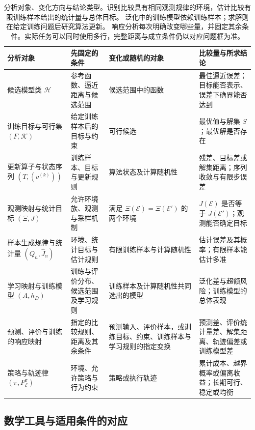\begin{table}[htbp]
  \centering
  \begin{tabularx}{\linewidth}{>{\RaggedRight\arraybackslash}p{.18\linewidth}XXX}
    \toprule
    分析对象 & 先固定的条件 & 变化或随机的对象 & 比较量与所求结论\\
    \midrule
    候选模型类 $\mathcal H$ & 参考函数、逼近距离与候选范围 & 候选范围中的函数 & 最佳逼近误差；目标能否表示、误差下确界能否达到\\
    训练目标与可行集 $(F,\mathcal K)$ & 给定训练样本后的目标与约束 & 可行候选 & 最优值与解集 $S$；最优解是否存在\\
    更新算子与状态序列 $(T,(v^{(k)}))$ & 训练样本、目标与更新规则 & 算法状态及计算随机性 & 残差、目标差或解集距离；序列收敛与有限步误差\\
    观测映射与统计目标 $(\Xi,J)$ & 允许环境族、观测与采样机制 & 满足 $\Xi(\mathcal E)=\Xi(\mathcal E')$ 的两个环境 & $J(\mathcal E)$ 是否等于 $J(\mathcal E')$；观测能否确定目标\\
    样本生成规律与统计量 $(Q_n,\widehat J_n)$ & 环境、统计目标与估计规则 & 有限训练样本与计算随机性 & 估计误差及其概率；有限样本能估计多准\\
    学习映射与训练模型 $(A,h_D)$ & 训练与评价分布、候选范围及学习规则 & 训练样本及计算随机性共同选出的模型 & 泛化差与超额风险；训练模型的总体表现\\
    预测、评价与训练的响应映射 & 指定的比较规则、距离及其余条件 & 预测输入、评价样本，或训练目标、约束、训练样本与学习规则的指定变换 & 预测差、评价统计量差、解集距离、轨迹偏差或训练模型差\\
    策略与轨迹律 $(\pi,P_{\mathcal E}^{\pi})$ & 环境、允许策略与行为约束 & 策略或执行轨迹 & 累计成本、越界概率或偏离收益；长期可行、稳定或均衡\\
    \bottomrule
  \end{tabularx}
  \caption{分析对象、变化方向与结论类型。识别比较具有相同观测规律的环境，估计比较有限训练样本给出的统计量与总体目标。
  泛化中的训练模型依赖训练样本；求解则在给定训练问题后研究算法更新。
  响应分析每次明确改变哪些量，并固定其余条件。实际任务可以同时使用多行，完整距离与成立条件仍以对应问题框为准。}
  \label{tab:future-object-conclusion-types}
\end{table}

\subsection{数学工具与适用条件的对应}
\label{sec:future-tool-condition-correspondence}

